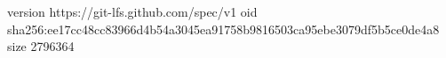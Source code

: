 version https://git-lfs.github.com/spec/v1
oid sha256:ee17cc48cc83966d4b54a3045ea91758b9816503ca95ebe3079df5b5ce0de4a8
size 2796364
